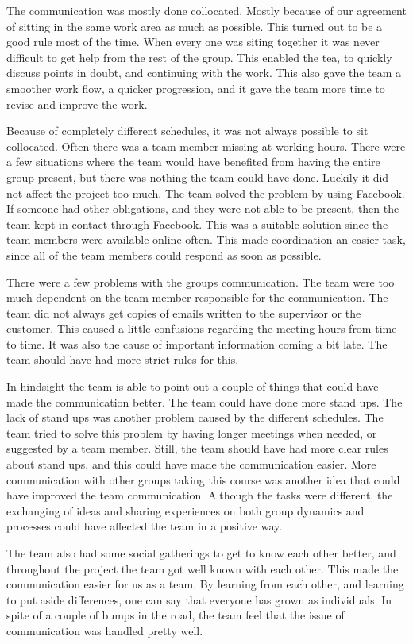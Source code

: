 The communication was mostly done collocated. Mostly because of our agreement of sitting in the same work area as much as possible. This turned out to be a good rule most of the time. 
When every one was siting together it was never difficult to get help from the rest of the group. This enabled the tea, to quickly discuss points in doubt, and continuing with the work. This also gave the team a smoother work flow, a quicker progression, and it gave the team more time to revise and improve the work.

Because of completely different schedules, it was not always possible to sit collocated. Often there was a team member missing at working hours. There were a few situations where the team would have benefited from having the entire group present, but there was nothing the team could have done. Luckily it did not affect the project too much. The team solved the problem by using Facebook. If someone had other obligations, and they were not able to be present, then the team kept in contact through Facebook. This was a suitable solution since the team members were available online often. This made coordination an easier task, since all of the team members could respond as soon as possible. 

There were a few problems with the groups communication. The team were too much dependent on the team member responsible for the communication. The team did not always get copies of emails written to the supervisor or the customer. This caused a little confusions regarding the meeting hours from time to time. It was also the cause of important information coming a bit late. The team should have had more strict rules for this.

In hindsight the team is able to point out a couple of things that could have made the communication better. The team could have done more stand ups. The lack of stand ups was another problem caused by the different schedules. The team tried to solve this problem by having longer meetings when needed, or suggested by a team member. Still, the team should have had more clear rules about stand ups, and this could have made the communication easier. 
More communication with other groups taking this course was another idea that could have improved the team communication.
Although the tasks were different, the exchanging of ideas and sharing experiences on both group dynamics and processes could have affected the team in a positive way. 

The team also had some social gatherings to get to know each other better, and throughout the project the team got well known with each other. This made the communication easier for us as a team. By learning from each other, and learning to put aside differences, one can say that everyone has grown as individuals. In spite of a couple of bumps in the road, the team feel that the issue of communication was handled pretty well.

